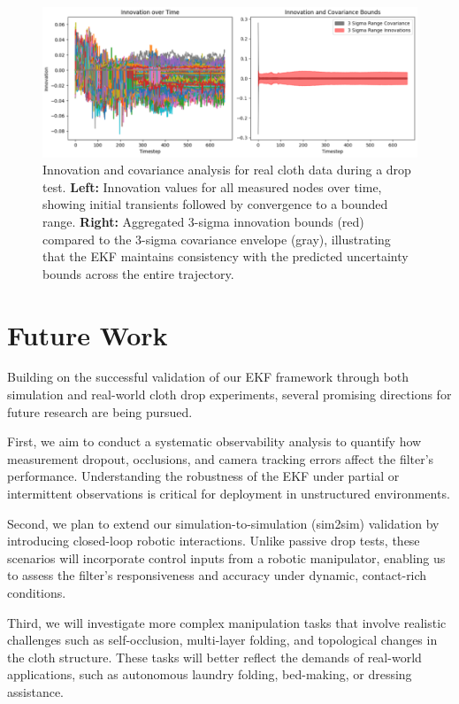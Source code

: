 \begin{figure}
    \centering
    \includegraphics[width=\linewidth]{CLOTH REPORT PICS/real_cloth_data_crop.png}
    \caption{Innovation and covariance analysis for real cloth data during a drop test. \textbf{Left:} Innovation values for all measured nodes over time, showing initial transients followed by convergence to a bounded range. \textbf{Right:} Aggregated 3-sigma innovation bounds (red) compared to the 3-sigma covariance envelope (gray), illustrating that the EKF maintains consistency with the predicted uncertainty bounds across the entire trajectory.}
    \label{fig:real_cloth_innov}
\end{figure}

\section{Future Work}

Building on the successful validation of our EKF framework through both simulation and real-world cloth drop experiments, several promising directions for future research are being pursued.

First, we aim to conduct a systematic observability analysis to quantify how measurement dropout, occlusions, and camera tracking errors affect the filter's performance. Understanding the robustness of the EKF under partial or intermittent observations is critical for deployment in unstructured environments.

Second, we plan to extend our simulation-to-simulation (sim2sim) validation by introducing closed-loop robotic interactions. Unlike passive drop tests, these scenarios will incorporate control inputs from a robotic manipulator, enabling us to assess the filter's responsiveness and accuracy under dynamic, contact-rich conditions.

Third, we will investigate more complex manipulation tasks that involve realistic challenges such as self-occlusion, multi-layer folding, and topological changes in the cloth structure. These tasks will better reflect the demands of real-world applications, such as autonomous laundry folding, bed-making, or dressing assistance.

